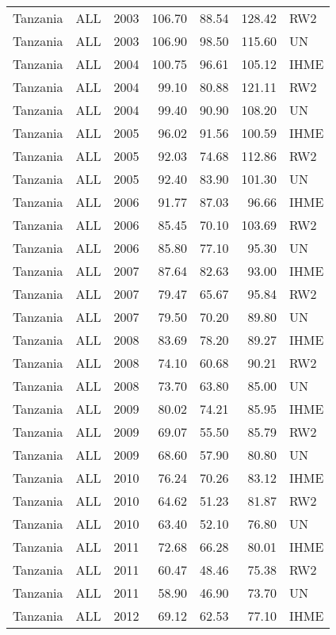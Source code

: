 \begin{longtable}{lllrrrl}
  Tanzania & ALL & 2003 & 106.70 & 88.54 & 128.42 & RW2 \\ 
  Tanzania & ALL & 2003 & 106.90 & 98.50 & 115.60 & UN \\ 
  Tanzania & ALL & 2004 & 100.75 & 96.61 & 105.12 & IHME \\ 
  Tanzania & ALL & 2004 & 99.10 & 80.88 & 121.11 & RW2 \\ 
  Tanzania & ALL & 2004 & 99.40 & 90.90 & 108.20 & UN \\ 
  Tanzania & ALL & 2005 & 96.02 & 91.56 & 100.59 & IHME \\ 
  Tanzania & ALL & 2005 & 92.03 & 74.68 & 112.86 & RW2 \\ 
  Tanzania & ALL & 2005 & 92.40 & 83.90 & 101.30 & UN \\ 
  Tanzania & ALL & 2006 & 91.77 & 87.03 & 96.66 & IHME \\ 
  Tanzania & ALL & 2006 & 85.45 & 70.10 & 103.69 & RW2 \\ 
  Tanzania & ALL & 2006 & 85.80 & 77.10 & 95.30 & UN \\ 
  Tanzania & ALL & 2007 & 87.64 & 82.63 & 93.00 & IHME \\ 
  Tanzania & ALL & 2007 & 79.47 & 65.67 & 95.84 & RW2 \\ 
  Tanzania & ALL & 2007 & 79.50 & 70.20 & 89.80 & UN \\ 
  Tanzania & ALL & 2008 & 83.69 & 78.20 & 89.27 & IHME \\ 
  Tanzania & ALL & 2008 & 74.10 & 60.68 & 90.21 & RW2 \\ 
  Tanzania & ALL & 2008 & 73.70 & 63.80 & 85.00 & UN \\ 
  Tanzania & ALL & 2009 & 80.02 & 74.21 & 85.95 & IHME \\ 
  Tanzania & ALL & 2009 & 69.07 & 55.50 & 85.79 & RW2 \\ 
  Tanzania & ALL & 2009 & 68.60 & 57.90 & 80.80 & UN \\ 
  Tanzania & ALL & 2010 & 76.24 & 70.26 & 83.12 & IHME \\ 
  Tanzania & ALL & 2010 & 64.62 & 51.23 & 81.87 & RW2 \\ 
  Tanzania & ALL & 2010 & 63.40 & 52.10 & 76.80 & UN \\ 
  Tanzania & ALL & 2011 & 72.68 & 66.28 & 80.01 & IHME \\ 
  Tanzania & ALL & 2011 & 60.47 & 48.46 & 75.38 & RW2 \\ 
  Tanzania & ALL & 2011 & 58.90 & 46.90 & 73.70 & UN \\ 
  Tanzania & ALL & 2012 & 69.12 & 62.53 & 77.10 & IHME \\ 

\end{longtable}
